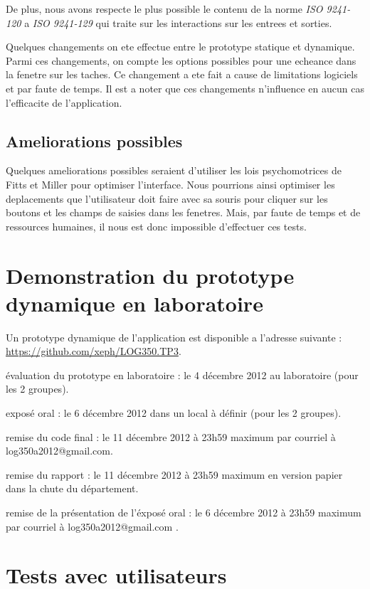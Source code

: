 \documentclass[letterpaper, oneside, 12pt, these, creativecommons]{thETS}
\begin{document}
De plus, nous avons respecte le plus possible le contenu de la norme \emph{ISO 9241-120} a \emph{ISO 9241-129} qui traite sur les interactions sur les entrees et sorties.

Quelques changements on ete effectue entre le prototype statique et dynamique. Parmi ces changements, on compte les options possibles pour une echeance dans la fenetre sur les taches. Ce changement a ete fait a cause de limitations logiciels et par faute de temps. Il est a noter que ces changements n'influence en aucun cas l'efficacite de l'application.

\section{Ameliorations possibles}

Quelques ameliorations possibles seraient d'utiliser les lois psychomotrices de Fitts et Miller pour optimiser l'interface. Nous pourrions ainsi optimiser les deplacements que l'utilisateur doit faire avec sa souris pour cliquer sur les boutons et les champs de saisies dans les fenetres. Mais, par faute de temps et de ressources humaines, il nous est donc impossible d'effectuer ces tests.

\chapter{Demonstration du prototype dynamique en laboratoire}

Un prototype dynamique de l'application est disponible a l'adresse suivante : \\
\url{https://github.com/xeph/LOG350.TP3}.

évaluation du prototype en laboratoire  : le 4 décembre 2012 au laboratoire (pour les 2 groupes).

exposé oral  : le 6 décembre 2012 dans un local à définir (pour les 2 groupes).

remise du code final : le 11 décembre 2012 à 23h59 maximum par courriel à log350a2012@gmail.com.

remise du rapport :  le 11 décembre 2012 à 23h59 maximum en version papier dans la chute du département.

remise de la présentation de l’éxposé oral : le 6 décembre 2012 à 23h59 maximum par courriel à log350a2012@gmail.com .

\chapter{Tests avec utilisateurs}
\end{document}

